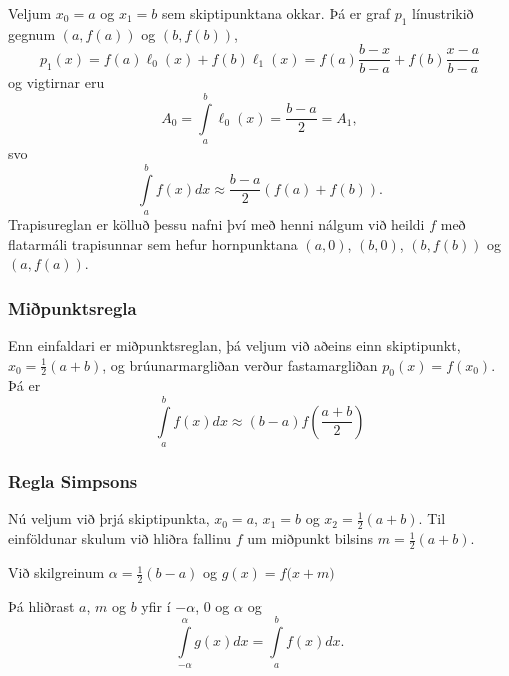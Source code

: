 \documentclass[icelandic,a4paper,12pt]{article}
\begin{document}
\pause
\smallskip
Veljum $x_0 = a$ og $x_1 = b$ sem skiptipunktana okkar. Þá er
graf $p_1$ línustrikið gegnum $(a,f(a))$ og $(b,f(b))$, 
\begin{equation*}
  p_1(x) = f(a) \ell_0(x) + f(b) \ell_1(x)
  = f(a)\frac{b-x}{b-a} + f(b) \frac{x-a}{b-a}
\end{equation*}
og vigtirnar eru
\begin{equation*}
  A_0 = \int\limits_a^b \ell_0(x) = \frac{b-a}{2} = A_1,
\end{equation*}
svo
\begin{equation*}
  \int\limits_a^b f(x) dx \approx 
  \frac{b-a}{2}\left(f(a)+f(b)\right).
\end{equation*}
Trapisureglan er kölluð þessu nafni því með henni nálgum við heildi
$f$ með flatarmáli trapisunnar sem hefur hornpunktana $(a,0)$,
$(b,0)$, $(b,f(b))$ og $(a,f(a))$. 



\subsubsection{Miðpunktsregla} 
Enn einfaldari er miðpunktsreglan, þá veljum við aðeins einn skiptipunkt, 
$x_0 = \frac{1}{2}(a+b)$, og brúunarmargliðan verður fastamargliðan 
$p_0(x) = f(x_0)$. Þá er
\begin{equation*}
  \int\limits_a^b f(x) dx \approx (b-a)f\left(\frac{a+b}{2}\right)
\end{equation*}



\subsubsection{Regla Simpsons} 
Nú veljum við þrjá skiptipunkta, $x_0 = a$, $x_1 = b$ og $x_2 =
\frac{1}{2}(a+b)$. Til einföldunar skulum við hliðra fallinu $f$
um miðpunkt bilsins $m=\tfrac{1}{2}(a+b)$.

\smallskip
Við skilgreinum $\alpha=\tfrac 12(b-a)$ og 
$g(x) = f\big(x+m\big)$

\pause
Þá hliðrast $a$, $m$ og $b$ yfir í $-\alpha$, $0$ og $\alpha$ og 
\begin{equation*}
  \int\limits_{-\alpha}^{\alpha} g(x) dx = 
  \int\limits_a^b f(x) dx.
\end{equation*}
\end{document}
